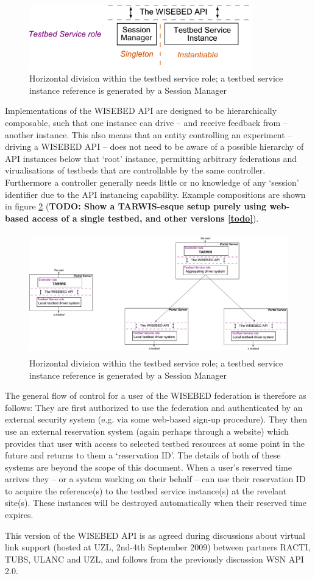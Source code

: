 \begin{figure}[htb]
\centering
\includegraphics[height=80pt]{images/APIconcept2}
\caption{Horizontal division within the testbed service role; a testbed service instance reference is generated by a Session Manager}
\label{fig:api_concept2}
\end{figure}

Implementations of the WISEBED API are designed to be hierarchically composable, such that one instance can drive -- and receive feedback from -- another instance. This also means that an entity controlling an experiment -- driving a WISEBED API -- does not need to be aware of a possible hierarchy of API instances below that `root' instance, permitting arbitrary federations and virualisations of testbeds that are controllable by the same controller. Furthermore a controller generally needs little or no knowledge of any `session' identifier due to the API instancing capability. Example compositions are shown in figure \ref{fig:api_concept3} ({\bf TODO: Show a TARWIS-esque setup purely using web-based access of a single testbed, and other versions \ref{todo}}).


\begin{figure}[htb]
\centering
\includegraphics[height=150pt]{images/APIconcept3}
\caption{Horizontal division within the testbed service role; a testbed service instance reference is generated by a Session Manager}
\label{fig:api_concept3}
\end{figure}


The general flow of control for a user of the WISEBED federation is therefore as follows: They are first authorized to use the federation and authenticated by an external security system (e.g. via some web-based sign-up procedure). They then use an external reservation system (again perhaps through a website) which provides that user with access to selected testbed resources at some point in the future and returns to them a `reservation ID'. The details of both of these systems are beyond the scope of this document. When a user's reserved time arrives they -- or a system working on their behalf -- can use their reservation ID to acquire the reference(s) to the testbed service instance(s) at the revelant site(s). These instances will be destroyed automatically when their reserved time expires. %


This version of the WISEBED API is as agreed during discussions about virtual link support (hosted at UZL, 2nd-4th September 2009) between partners RACTI, TUBS, ULANC and UZL, and follows from the previously discussion WSN API 2.0.
